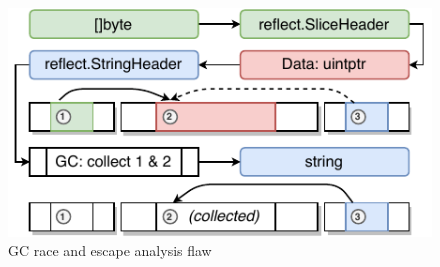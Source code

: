\begin{figure}[!t]
    \centering
    \includegraphics[width=\textwidth]{assets/figures/gcrace-vuln.pdf}
    \caption{GC race and escape analysis flaw}
    \label{fig:gcrace-vuln}
\end{figure}
